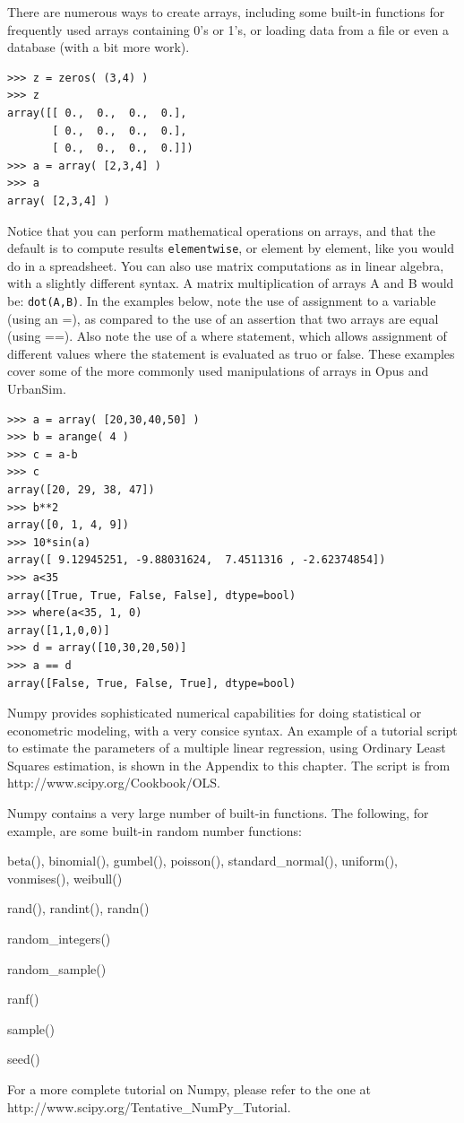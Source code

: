 There are numerous ways to create arrays, including some built-in functions for frequently used arrays containing 0's or 1's, or loading data from a file or even a database (with a bit more work).

\begin{lstlisting}
>>> z = zeros( (3,4) )
>>> z
array([[ 0.,  0.,  0.,  0.],
       [ 0.,  0.,  0.,  0.],
       [ 0.,  0.,  0.,  0.]])
>>> a = array( [2,3,4] )
>>> a
array( [2,3,4] )
\end{lstlisting}

Notice that you can perform mathematical operations on arrays, and that the default is to compute results \verb#elementwise#, or element by element, like you would do in a spreadsheet.  You can also use matrix computations as in linear algebra, with a slightly different syntax.   A matrix multiplication of arrays A and B would be: \verb#dot(A,B)#.  In the examples below, note the use of assignment to a variable (using an =), as compared to the use of an assertion that two arrays are equal (using ==). Also note the use of a where statement, which allows assignment of different values where the statement is evaluated as truo or false.  These examples cover some of the more commonly used manipulations of arrays in Opus and UrbanSim.

\begin{lstlisting}
>>> a = array( [20,30,40,50] )
>>> b = arange( 4 )
>>> c = a-b
>>> c
array([20, 29, 38, 47])
>>> b**2
array([0, 1, 4, 9])
>>> 10*sin(a)
array([ 9.12945251, -9.88031624,  7.4511316 , -2.62374854])
>>> a<35
array([True, True, False, False], dtype=bool)
>>> where(a<35, 1, 0)
array([1,1,0,0)]
>>> d = array([10,30,20,50)]
>>> a == d
array([False, True, False, True], dtype=bool)
\end{lstlisting}

Numpy provides sophisticated numerical capabilities for doing statistical or econometric modeling, with a very consice syntax.  An example of a tutorial script to estimate  the parameters of a multiple linear regression, using Ordinary Least Squares estimation, is shown in the Appendix to this chapter.  The script is from http://www.scipy.org/Cookbook/OLS.



Numpy contains a very large number of built-in functions. The following, for example, are some built-in random number functions:

\squishlist
\item beta(), binomial(), gumbel(), poisson(), standard\_normal(), uniform(), vonmises(), weibull()
\item rand(), randint(), randn()
\item random\_integers()
\item random\_sample()
\item ranf()
\item sample()
\item seed()
\squishend

For a more complete tutorial on Numpy, please refer to the one at http://www.scipy.org/Tentative\_NumPy\_Tutorial.
